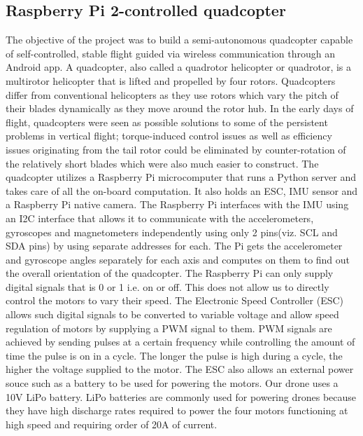 \subsection{Raspberry Pi 2-controlled quadcopter}
The objective of the project was to build a semi-autonomous quadcopter capable of self-controlled, stable flight guided via wireless communication through an Android app. 
A quadcopter, also called a quadrotor helicopter or quadrotor, is a multirotor helicopter that is lifted and propelled by four rotors. Quadcopters differ from conventional helicopters as they use rotors which vary the pitch of their blades dynamically as they move around the rotor hub. 
\newline \newline
In the early days of flight, quadcopters were seen as possible solutions to some of the persistent problems in vertical flight; torque-induced control issues as well as efficiency issues originating from the tail rotor could be eliminated by counter-rotation of the relatively short blades which were also much easier to construct.
\newline
\newline
The quadcopter utilizes a Raspberry Pi microcomputer that runs a Python server and takes care of all the on-board computation. It also holds an ESC, IMU sensor and a Raspberry Pi native camera.
\newline \newline
 The Raspberry Pi interfaces with the IMU using an I2C interface that allows it to communicate with the accelerometers, gyroscopes and magnetometers independently using only 2 pins(viz. SCL and SDA pins) by using separate addresses for each. The Pi gets the accelerometer and gyroscope angles separately for each axis and computes on them to find out the overall orientation of the quadcopter.
\newline
\newline
The Raspberry Pi can only supply digital signals that is 0 or 1 i.e. on or off. This does not allow us to directly control the motors to vary their speed. The Electronic Speed Controller (ESC) allows such digital signals to be converted to variable voltage and allow speed regulation of motors by supplying a PWM signal to them. PWM signals are achieved by sending pulses at a certain frequency while controlling the amount of time the pulse is on in a cycle. The longer the pulse is high during a cycle, the higher the voltage supplied to the motor. 
\newline
The ESC also allows an external power souce such as a battery to be used for powering the motors. Our drone uses a 10V LiPo battery. LiPo batteries are commonly used for powering drones because they have high discharge rates required to power the four motors functioning at high speed and requiring order of 20A of current. 
